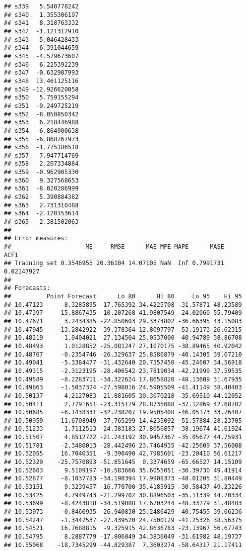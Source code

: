 \documentclass[
]{book}
\begin{document}
\begin{verbatim}
## s339   5.540778242
## s340   1.355306197
## s341   8.318763332
## s342  -1.121312910
## s343  -5.046428433
## s344   6.391044659
## s345  -4.579673607
## s346   6.225392239
## s347  -0.632907993
## s348  13.461125116
## s349 -12.926620058
## s350   5.759155294
## s351  -9.249725219
## s352  -8.050850342
## s353   6.218446988
## s354  -6.864900638
## s355  -6.868767973
## s356  -1.775186518
## s357   7.947714769
## s358   2.207334884
## s359  -0.962905330
## s360   9.327568653
## s361  -8.020286999
## s362   5.390884382
## s363   2.731310488
## s364  -2.120153614
## s365   2.381502063
## 
## Error measures:
##                     ME     RMSE      MAE MPE MAPE      MASE       ACF1
## Training set 0.3546955 20.36104 14.07105 NaN  Inf 0.7991731 0.02147927
## 
## Forecasts:
##          Point Forecast      Lo 80      Hi 80     Lo 95    Hi 95
## 10.47123      8.3285895 -17.765392 34.4225708 -31.57871 48.23589
## 10.47397     15.8867435 -10.207268 41.9807549 -24.02060 55.79409
## 10.47671      3.2434385 -22.850603 29.3374802 -36.66395 43.15083
## 10.47945    -13.2842922 -39.378364 12.8097797 -53.19173 26.62315
## 10.48219     -1.0404021 -27.134504 25.0537000 -40.94789 38.86708
## 10.48493      1.0128852 -25.081247 27.1070175 -38.89465 40.92042
## 10.48767     -0.2354746 -26.329637 25.8586879 -40.14305 39.67210
## 10.49041     -5.3384477 -31.432640 20.7557450 -45.24607 34.56918
## 10.49315     -2.3123195 -28.406542 23.7819034 -42.21999 37.59535
## 10.49589     -8.2283711 -34.322624 17.8658820 -48.13609 31.67935
## 10.49863     -1.5037324 -27.598016 24.5905509 -41.41149 38.40403
## 10.50137      4.2127083 -21.881605 30.3070218 -35.69510 44.12052
## 10.50411      2.7791651 -23.315179 28.8735088 -37.12869 42.68702
## 10.50685     -6.1438331 -32.238207 19.9505408 -46.05173 33.76407
## 10.50959    -11.6708949 -37.765299 14.4235092 -51.57884 28.23705
## 10.51233      1.7112513 -24.383183 27.8056857 -38.19674 41.61924
## 10.51507      4.8512722 -21.243192 30.9457367 -35.05677 44.75931
## 10.51781     -2.3480013 -28.442496 23.7464935 -42.25609 37.56008
## 10.52055     16.7040351  -9.390490 42.7985601 -23.20410 56.61217
## 10.52329    -25.7570893 -51.851645  0.3374659 -65.66527 14.15109
## 10.52603      9.5109197 -16.583666 35.6055051 -30.39730 49.41914
## 10.52877     -8.1037783 -34.198394 17.9908373 -48.01205 31.80449
## 10.53151      9.3239457 -16.770700 35.4185915 -30.58437 49.23226
## 10.53425      4.7949743 -21.299702 30.8896503 -35.11339 44.70334
## 10.53699     -8.4243818 -34.519088 17.6703244 -48.33279 31.48403
## 10.53973     -0.8460935 -26.940830 25.2486429 -40.75455 39.06236
## 10.54247     -1.3447537 -27.439520 24.7500129 -41.25326 38.56375
## 10.54521     16.7688815  -9.325915 42.8636783 -23.13967 56.67743
## 10.54795      8.2887779 -17.806049 34.3836049 -31.61982 48.19737
## 10.55068    -18.7345299 -44.829387  7.3603274 -58.64317 21.17411
\end{verbatim}
\end{document}

